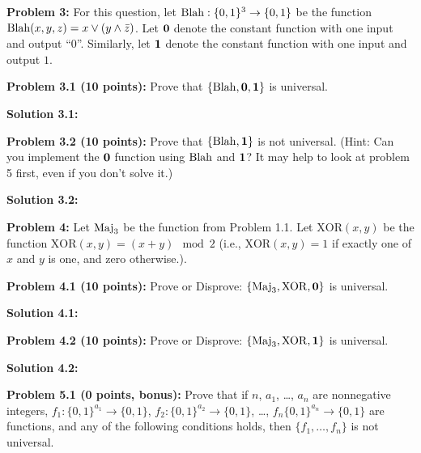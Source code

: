 \documentclass[11pt]{article}
\begin{document}
\newcommand{\XOR}{\mathrm{XOR}}

\iffalse{
Not sure what this text was doing here ... commented it out - (- Madhu)	
	f(0)=0
f(1)=1
f(a+b)+f(0)=f(a)+f(b)} \fi  


\textbf{Problem 3:} For this question, let $\mathrm{Blah}:\{0,1\}^3 \to\{0,1\}$ be the function $\mathrm{Blah}(x,y,z) = x \vee (y \wedge \bar{z})$. Let $\mathbf{0}$ denote the constant function with one input and output ``$0$''. Similarly, let $\mathbf{1}$ denote the constant function with one input and output $1$. 

\textbf{Problem 3.1 (10 points):} Prove that $\{\mathrm{Blah},\mathbf{0},\mathbf{1}\}$ is universal. 

\textbf{Solution 3.1:} %

\textbf{Problem 3.2 (10 points):} Prove that $\{\mathrm{Blah},\mathbf{1}\}$ is not universal. (Hint: Can you implement the $\mathbf{0}$ function using $\mathrm{Blah}$ and $\mathbf{1}$? It may help to look at problem 5 first, even if you don't solve it.)

\textbf{Solution 3.2:} %

\textbf{Problem 4:} Let $\mathrm{Maj}_3$ be the function from Problem 1.1. Let $\XOR(x,y)$ be the function $\XOR(x,y) = (x + y) \mod 2$ (i.e., $\XOR(x,y) = 1$ if exactly one of $x$ and $y$ is one, and zero otherwise.).

\textbf{Problem 4.1 (10 points):} Prove or Disprove:  $\{\Maj_3,\XOR,\Zero\}$ is universal. 

\textbf{Solution 4.1:} %

\textbf{Problem 4.2 (10 points):} Prove or Disprove:  $\{\Maj_3,\XOR,\One\}$ is universal. 

\textbf{Solution 4.2:} %

\textbf{Problem 5.1 (0 points, bonus):} Prove that if $n$, $a_1$, \ldots, $a_n$ are nonnegative integers, $f_1: \{0, 1\}^{a_1} \to \{0,1\}$, $f_2: \{0, 1\}^{a_2} \to \{0,1\}$, \ldots, $f_n\{0, 1\}^{a_n} \to \{0,1\}$ are functions, and any of the following conditions holds, then $\{f_1, \ldots, f_n\}$ is not universal.
\end{document}

